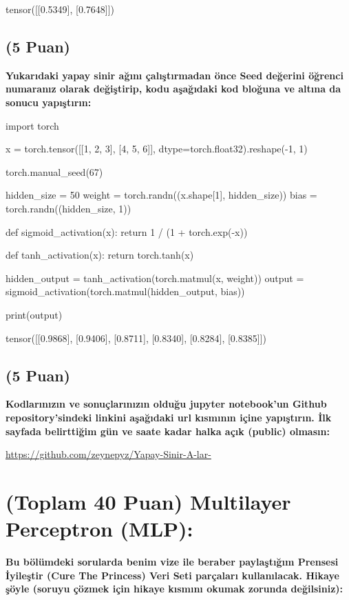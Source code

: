 \documentclass[11pt]{article}
\begin{document}
tensor([[0.5349],
        [0.7648]])

\subsection{(5 Puan)} \textbf{Yukarıdaki yapay sinir ağını çalıştırmadan önce Seed değerini öğrenci numaranız olarak değiştirip, kodu aşağıdaki kod bloğuna ve altına da sonucu yapıştırın:}

\begin{python}
import torch

x = torch.tensor([[1, 2, 3], [4, 5, 6]], dtype=torch.float32).reshape(-1, 1)

torch.manual_seed(67)

hidden_size = 50
weight = torch.randn((x.shape[1], hidden_size))
bias = torch.randn((hidden_size, 1))

def sigmoid_activation(x):
    return 1 / (1 + torch.exp(-x))

def tanh_activation(x):
    return torch.tanh(x)

hidden_output = tanh_activation(torch.matmul(x, weight))
output = sigmoid_activation(torch.matmul(hidden_output, bias))

print(output)

\end{python}

tensor([[0.9868],
        [0.9406],
        [0.8711],
        [0.8340],
        [0.8284],
        [0.8385]])

\subsection{(5 Puan)} \textbf{Kodlarınızın ve sonuçlarınızın olduğu jupyter notebook'un Github repository'sindeki linkini aşağıdaki url kısmının içine yapıştırın. İlk sayfada belirttiğim gün ve saate kadar halka açık (public) olmasın:}

\url{https://github.com/zeynepyz/Yapay-Sinir-A-lar-}

\section{(Toplam 40 Puan) Multilayer Perceptron (MLP):} 
\textbf{Bu bölümdeki sorularda benim vize ile beraber paylaştığım Prensesi İyileştir (Cure The Princess) Veri Seti parçaları kullanılacak. Hikaye şöyle (soruyu çözmek için hikaye kısmını okumak zorunda değilsiniz):} 
\end{document}
